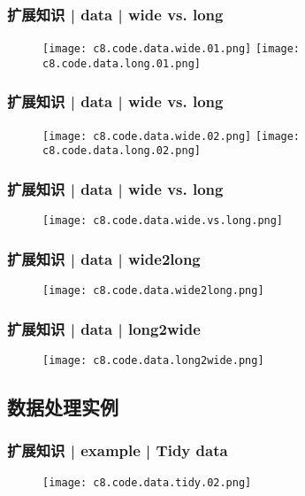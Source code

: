 \begin{frame}
  \frametitle{扩展知识 | data | wide vs. long}
  \begin{figure}
    \centering
    \texttt{[image: c8.code.data.wide.01.png]}
    \texttt{[image: c8.code.data.long.01.png]}
  \end{figure}
\end{frame}

\begin{frame}
  \frametitle{扩展知识 | data | wide vs. long}
  \begin{figure}
    \centering
    \texttt{[image: c8.code.data.wide.02.png]}
    \quad
    \texttt{[image: c8.code.data.long.02.png]}
  \end{figure}
\end{frame}

\begin{frame}
  \frametitle{扩展知识 | data | wide vs. long}
  \begin{figure}
    \centering
    \texttt{[image: c8.code.data.wide.vs.long.png]}
  \end{figure}
\end{frame}

\begin{frame}
  \frametitle{扩展知识 | data | wide2long}
  \begin{figure}
    \centering
    \texttt{[image: c8.code.data.wide2long.png]}
  \end{figure}
\end{frame}

\begin{frame}
  \frametitle{扩展知识 | data | long2wide}
  \begin{figure}
    \centering
    \texttt{[image: c8.code.data.long2wide.png]}
  \end{figure}
\end{frame}

\subsection{数据处理实例}
\begin{frame}
  \frametitle{扩展知识 | example | Tidy data}
  \begin{figure}
    \centering
    \texttt{[image: c8.code.data.tidy.02.png]}
  \end{figure}
\end{frame}

